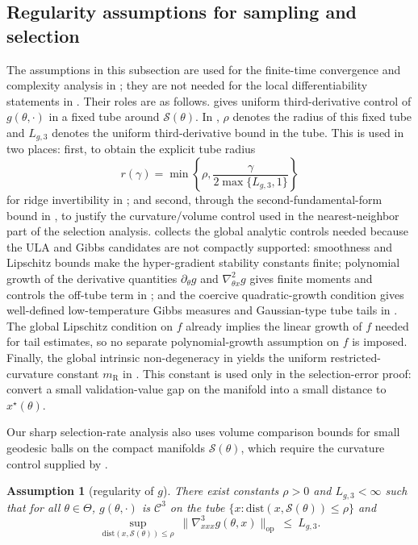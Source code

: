 \documentclass{article}
\theoremstyle{normaltheorem}
\newtheorem{assumption}{Assumption}
\newcommand{\calS}{\mathcal{S}}
\begin{document}
\subsection{Regularity assumptions for sampling and selection}\label{append:regularity-assumption}
The assumptions in this subsection are used for the finite-time convergence and complexity analysis in
; they are not needed for the local differentiability statements in .
Their roles are as follows.
 gives uniform third-derivative control of \(g(\theta,\cdot)\) in a fixed tube around
\(\calS(\theta)\). In , \(\rho\) denotes the radius of this fixed tube and \(L_{g,3}\) denotes the
uniform third-derivative bound in the tube. This is used in two places: first, to obtain the explicit tube radius
\[
r(\gamma)=\min\left\{\rho,\frac{\gamma}{2\max\{L_{g,3},1\}}\right\}
\]
for ridge invertibility in ; and second, through the second-fundamental-form bound in
, to justify the curvature/volume control used in the nearest-neighbor part of the
selection analysis.
 collects the global analytic controls needed because the ULA and Gibbs candidates are not
compactly supported: smoothness and Lipschitz bounds make the hyper-gradient stability constants finite; polynomial
growth of the derivative quantities \(\partial_\theta g\) and \(\nabla^2_{\theta x}g\) gives finite moments and controls
the off-tube term in ; and the coercive quadratic-growth condition gives well-defined
low-temperature Gibbs measures and Gaussian-type tube tails in . The global Lipschitz
condition on \(f\) already implies the linear growth of \(f\) needed for tail estimates, so no separate polynomial-growth
assumption on \(f\) is imposed. Finally, the global intrinsic non-degeneracy in
 yields the uniform restricted-curvature constant \(m_{\mathrm R}\) in
. This constant is used only in the selection-error proof:
 convert a small validation-value gap on the manifold into a
small distance to \(x^\star(\theta)\).

Our sharp selection-rate analysis also uses volume comparison bounds for small geodesic balls on the compact manifolds
\(\calS(\theta)\), which require the curvature control supplied by .


\begin{tcolorbox}[colback=gray!20, colframe=gray!50, boxrule=0pt, arc=0mm, left=0mm, right=0mm, top=0mm, bottom=0mm]
\begin{assumption}[regularity of $g$]\label{ass:curvature_g}
There exist constants \(\rho>0\) and \(L_{g,3}<\infty\) such that for all \(\theta\in\Theta\),
\(g(\theta,\cdot)\) is \(\mathcal{C}^{3}\) on the tube \(\{x:\mathrm{dist}(x,\calS(\theta))\le \rho\}\) and
\[
\sup_{\mathrm{dist}(x,\calS(\theta))\le \rho}\ \big\|\nabla^3_{xxx}g(\theta,x)\big\|_{\mathrm{op}}\ \le\ L_{g,3}.
\]
\end{assumption}
\end{tcolorbox}
\end{document}
